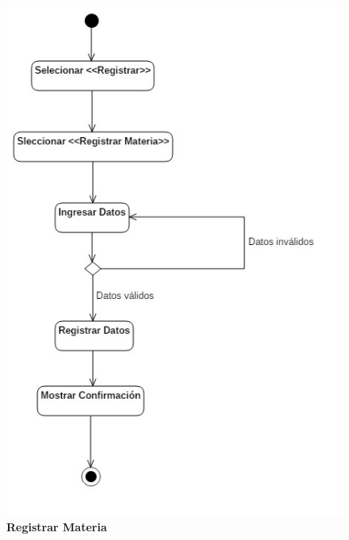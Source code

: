 \begin{figure}[H]
  \centering
    \includegraphics[scale=.8,angle=0]{project/Actividades/materia.jpg}
  \caption{\textbf{Registrar Materia}}
\end{figure}
